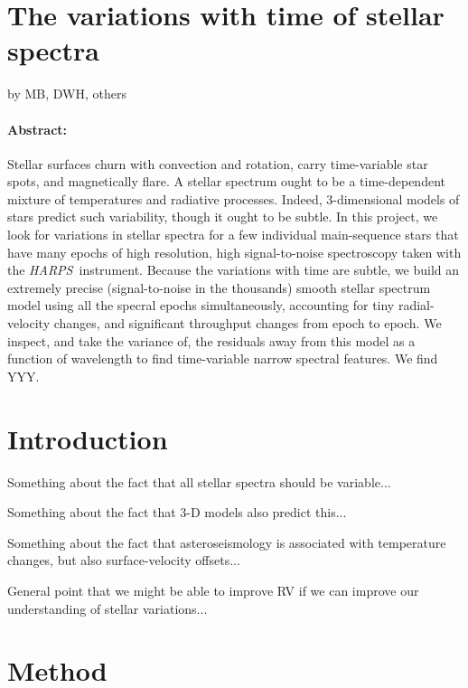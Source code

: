 \documentclass[12pt, letterpaper]{article}
\newcommand{\acronym}[1]{{\small{#1}}}
\newcommand{\project}[1]{\textsl{#1}}
\newcommand{\harps}{\project{\acronym{HARPS}}}
\begin{document}
\section*{The variations with time of stellar spectra}

\noindent
by MB, DWH, others

\paragraph{Abstract:}
Stellar surfaces churn with convection and rotation, carry
time-variable star spots, and magnetically flare.
A stellar spectrum ought to be a time-dependent mixture of temperatures
and radiative processes.
Indeed, 3-dimensional models of stars predict such variability, though
it ought to be subtle.
In this project, we look for variations in stellar spectra for a few
individual main-sequence stars that have many epochs of high
resolution, high signal-to-noise spectroscopy taken with the
\harps\ instrument.
Because the variations with time are subtle, we build an extremely
precise (signal-to-noise in the thousands) smooth stellar spectrum
model using all the specral epochs simultaneously, accounting for tiny
radial-velocity changes, and significant throughput changes from epoch
to epoch.
We inspect, and take the variance of, the residuals away from this
model as a function of wavelength to find time-variable narrow
spectral features.
We find YYY.

\section{Introduction}

Something about the fact that all stellar spectra should be variable...

Something about the fact that 3-D models also predict this...

Something about the fact that asteroseismology is associated with temperature changes, but also surface-velocity offsets...

General point that we might be able to improve RV if we can improve our understanding of stellar variations...

\section{Method}
\end{document}
